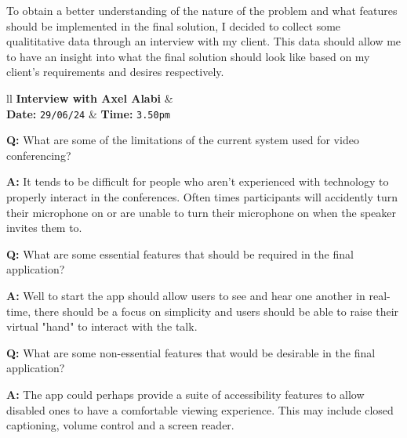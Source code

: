 \vspace{0.2cm}

To obtain a better understanding of the nature of the problem
and what features should be implemented in the final solution,
I decided to collect some qualititative data through an 
interview with my client. This data should allow me to have an
insight into what the final solution should look like based
on my client's requirements and desires respectively.

\begin{tcolorbox}[
  boxrule=0pt, frame empty, colback=lightestgray, arc=0pt,
  breakable, colframe=white
]
  \begin{tblr}{ll}
    \textbf{Interview with Axel Alabi} & {}\\
    \textbf{Date: } \texttt{29/06/24} &
    {\hspace{-1.5cm} \textbf{Time: } \texttt{3.50pm}}
  \end{tblr}

  \vspace{0.2cm}

  \textbf{Q:} What are some of the limitations of the current
  system used for video conferencing? \vspace{0.05cm}

  \textbf{A:} It tends to be difficult for people who aren't 
  experienced with technology to properly interact in the 
  conferences. Often times participants will accidently turn 
  their microphone on or are unable to turn their microphone
  on when the speaker invites them to. \vspace{0.25cm}

  \textbf{Q:} What are some essential features that should be
  required in the final application? \vspace{0.05cm}

  \textbf{A:} Well to start the app should allow users to see 
  and hear one another in real-time, there should be a focus on
  simplicity and users should be able to raise their virtual 
  "hand" to interact with the talk. \vspace{0.25cm}

  \textbf{Q:} What are some non-essential features that would
  be desirable in the final application? \vspace{0.05cm}

  \textbf{A:} The app could perhaps provide a suite of 
  accessibility features to allow disabled ones to have a 
  comfortable viewing experience. This may include closed
  captioning, volume control and a screen reader.
  \vspace{0.25cm}


\end{tcolorbox}
